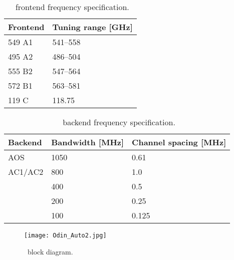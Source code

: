 \begin{table}
\caption{ \smr\ frontend frequency specification.}
\label{table:config1a}
\begin{tabular}{|l|l|}
  \hline
  \textbf{Frontend} & \textbf{Tuning range {[}GHz{]} } \\
  \hline
  549 A1            & 541--558              \\
  \hline
  495 A2            & 486--504              \\
  \hline
  555 B2            & 547--564             \\
 \hline
 572 B1             & 563--581              \\
 \hline
  119 C             &  118.75               \\
\hline
\end{tabular}
\end{table}



\begin{table}
\caption{ \smr\ backend frequency specification.}
\label{table:config1b}
\begin{tabular}{|l|l|l|}
  \hline
  \textbf{Backend} & \textbf{Bandwidth {[}MHz{]}} & \textbf{Channel spacing {[}MHz{]}} \\
  \hline
  AOS              & 1050                & 0.61\\
  \hline
  AC1/AC2          & 800                 & 1.0
 \\
 \cline{2-2}
 \cline{3-3}
                   & 400                  & 0.5 \\
 \cline{2-2}
 \cline{3-3}
                   & 200                  & 0.25 \\
 \cline{2-2}
 \cline{3-3}
                   & 100                 & 0.125 \\
\hline
\end{tabular}
\end{table}


\begin{figure}[t]
\texttt{[image: Odin\_Auto2.jpg]}
\caption{\smr\ block diagram.}
\label{fig:blockdiagram}
\end{figure}




